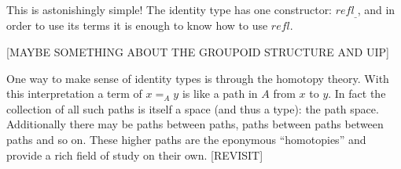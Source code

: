 This is astonishingly simple! The identity type has one constructor: $refl_{\_}$,
and in order to use its terms it is enough to know how to use $refl$.

[MAYBE SOMETHING ABOUT THE GROUPOID STRUCTURE AND UIP]

One way to make sense of identity types is through the homotopy theory. With
this interpretation a term of $x =_A y$ is like a path in $A$ from $x$ to $y$.
In fact the collection of all such paths is itself a space (and thus a type):
the path space. Additionally there may be paths between paths, paths between
paths between paths and so on. These higher paths are the eponymous
``homotopies'' and provide a rich field of study on their own. [REVISIT]